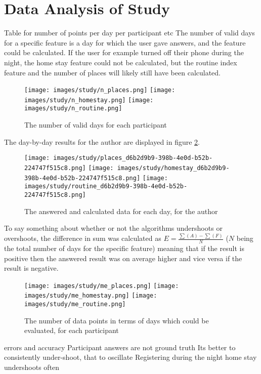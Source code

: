 \section{Data Analysis of Study}
Table for number of points per day per participant etc
The number of valid days for a specific feature is a day for which the user gave answers, and the feature could be calculated. If the user for example turned off their phone during the night, the home stay feature could not be calculated, but the routine index feature and the number of places will likely still have been calculated.

\begin{figure}
    \centering
    \texttt{[image: images/study/n\_places.png]}
    \texttt{[image: images/study/n\_homestay.png]}
    \texttt{[image: images/study/n\_routine.png]}
    \caption{The number of valid days for each participant}
    \label{fig:plot-daily}
\end{figure}

The day-by-day results for the author are displayed in figure \ref{fig:plot-daily}.

\begin{figure}
    \centering
    \texttt{[image: images/study/places\_d6b2d9b9-398b-4e0d-b52b-224747f515c8.png]}
    \texttt{[image: images/study/homestay\_d6b2d9b9-398b-4e0d-b52b-224747f515c8.png]}
    \texttt{[image: images/study/routine\_d6b2d9b9-398b-4e0d-b52b-224747f515c8.png]}
    \caption{The answered and calculated data for each day, for the author}
    \label{fig:plot-daily}
\end{figure}

To say something about whether or not the algorithms undershoots or overshoots, the difference in sum was calculated as $E = \frac{\sum(A) - \sum(F)}{N}$ ($N$ being the total number of days for the specific feature) meaning that if the result is positive then the answered result was on average higher and vice versa if the result is negative. 

\begin{figure}
    \centering
    \texttt{[image: images/study/me\_places.png]}
    \texttt{[image: images/study/me\_homestay.png]}
    \texttt{[image: images/study/me\_routine.png]}
    \caption{The number of data points in terms of days which could be evaluated, for each participant}
    \label{fig:plot-mean-error}
\end{figure}

errors and accuracy 
Participant answers are not ground truth
Its better to consistently under-shoot, that to oscillate
Registering during the night
home stay undershoots often